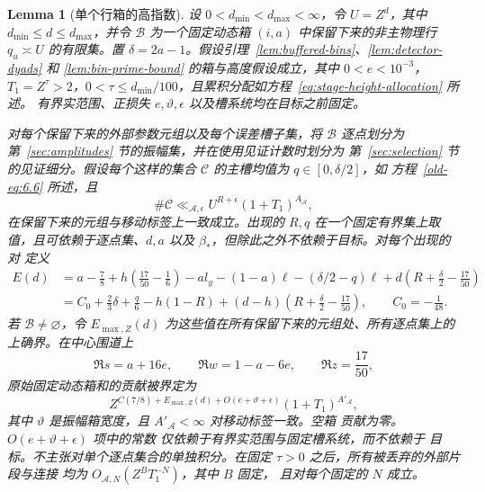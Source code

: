 \documentclass[11pt,a4paper]{article}
\numberwithin{equation}{section}
\numberwithin{figure}{section}
\newtheorem{lemma}[theorem]{Lemma}
\theoremstyle{definition}
\theoremstyle{remark}
\begin{document}
\begin{lemma}[单个行箱的高指数]\label{lem:high-bin}
设 \(0<d_{\min}<d_{\max}<\infty\)，令 \(U=Z^d\)，其中
\(d_{\min}\le d\le d_{\max}\)，并令
\(\mathcal B\) 为一个固定动态箱 \((i,a)\) 中保留下来的非主物理行
\(q_u\asymp U\) 的有限集。置
\(\delta=2a-1\)。假设引理~\ref{lem:buffered-bins}、\ref{lem:detector-dyads} 和
\ref{lem:bin-prime-bound} 的箱与高度假设成立，其中
\(0<e<10^{-3}\)，\(T_1=Z^\tau>2\)，\(0<\tau\le d_{\min}/100\)，且累积分配如方程~\eqref{eq:stage-height-allocation} 所述。
有界实范围、正损失 \(e,\vartheta,\epsilon\) 以及槽系统均在目标之前固定。

对每个保留下来的外部参数元组以及每个误差槽子集，将 \(\mathcal B\) 逐点划分为
第~\ref{sec:amplitudes} 节的振幅集，并在使用见证计数时划分为
第~\ref{sec:selection} 节的见证细分。假设每个这样的集合 \(\mathcal C\) 的主槽均值为 \(q\in[0,\delta/2]\)，如
方程~\eqref{old-eq:6.6} 所述，且
\[
 \#\mathcal C\ll_{\mathcal A,\epsilon}
 U^{R+\epsilon}(1+T_1)^{A_{\mathcal A}},
\]
在保留下来的元组与移动标签上一致成立。出现的 \(R,q\)
在一个固定有界集上取值，且可依赖于逐点集、\(d,a\)
以及 \(\beta_*\)，但除此之外不依赖于目标。对每个出现的对
定义
\begin{equation}\label{eq:common-high-exponent}
 \begin{split}
 E(d)
 &=a-\frac78+h\left(\frac{17}{50}-\frac16\right)
       -a l_y-(1-a)\ell-(\delta/2-q)\ell
       +d\left(R+\frac\delta2-\frac{17}{50}\right)\\
 &=C_0+\frac23\delta+\frac q6-h(1-R)
       +(d-h)\left(R+\frac\delta2-\frac{17}{50}\right),
       \qquad C_0=-\frac1{48}.
 \end{split}
\end{equation}
若 \(\mathcal B\ne\varnothing\)，令 \(E_{\max,Z}(d)\) 为这些值在所有保留下来的元组处、所有逐点集上的上确界。在中心围道上
\[
 \Re s=a+16e,\qquad \Re w=1-a-6e,\qquad \Re z=\frac{17}{50},
\]
原始固定动态箱和的贡献被界定为
\[
 Z^{C(7/8)+E_{\max,Z}(d)+O(e+\vartheta+\epsilon)}
 (1+T_1)^{A'_{\mathcal A}},
\]
其中 \(\vartheta\) 是振幅箱宽度，且
\(A'_{\mathcal A}<\infty\) 对移动标签一致。空箱
贡献为零。\(O(e+\vartheta+\epsilon)\) 项中的常数
仅依赖于有界实范围与固定槽系统，而不依赖于
目标。不主张对单个逐点集合的单独积分。在固定
\(\tau>0\) 之后，所有被丢弃的外部片段与连接
均为 \(O_{\mathcal A,N}(Z^B T_1^{-N})\)，其中 \(B\) 固定，
且对每个固定的 \(N\) 成立。
\end{lemma}
\end{document}
